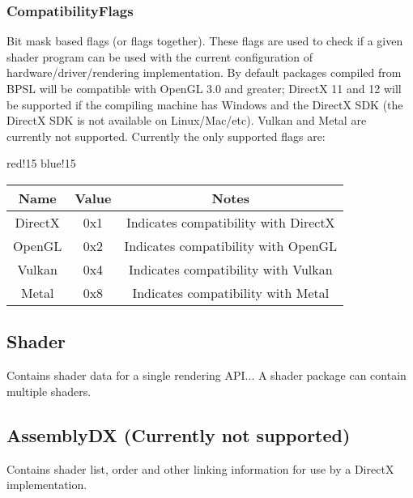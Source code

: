 \subsubsection{CompatibilityFlags}
Bit mask based flags (or flags together). These flags are used to check if a given shader program can be used with the current configuration of hardware/driver/rendering implementation. By default packages compiled from BPSL will be compatible with OpenGL 3.0 and greater; DirectX 11 and 12 will be supported if the compiling machine has Windows and the DirectX SDK (the DirectX SDK is not available on Linux/Mac/etc).\newline
Vulkan and Metal are currently not supported.\newline
Currently the only supported flags are:
\begin{center}
    {
        {red!15}
        {blue!15}
        \begin{tabular}{|c|c|c|}
            \hline
            \textbf{Name} & \textbf{Value} & \textbf{Notes} \\
    
            \hline\hline
            DirectX & 0x1 & Indicates compatibility with DirectX \cite{DirectX} \\
            OpenGL & 0x2 & Indicates compatibility with OpenGL \cite{OpenGL} \\
            Vulkan & 0x4 & Indicates compatibility with Vulkan \cite{Vulkan} \\
            Metal & 0x8 & Indicates compatibility with Metal \cite{Metal} \\
            \hline
        \end{tabular}
    }
\end{center}

\subsection{Shader}
Contains shader data for a single rendering API...\newline
A shader package can contain multiple shaders.

\subsection{AssemblyDX (Currently not supported)}
Contains shader list, order and other linking information for use by a DirectX \cite{DirectX} implementation.

